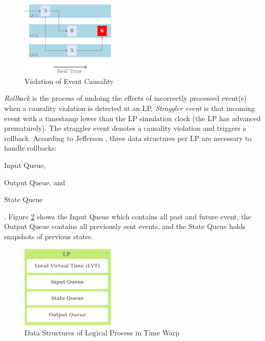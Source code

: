 \documentclass[11pt]{book}
\begin{document}
\begin{figure}
    \centering
    \includegraphics[width=0.4\textwidth]{figures/causality.pdf}
    \caption{Violation of Event Causality}\label{fig:causality_violation}
\end{figure}

\emph{Rollback} is the process of undoing the effects of incorrectly processed event(s) when a causality
violation is detected at an LP\@. \emph{Straggler event} is that incoming event with a timestamp lower than
the LP simulation clock (the LP has advanced prematurely).  The straggler event denotes a causality violation
and triggers a rollback.  According to Jefferson \cite{jefferson-85}, three data structures per LP are
necessary to handle rollbacks: \begin{inparaenum} [(1)] \item Input Queue, \item Output Queue, and \item State
  Queue\end{inparaenum}.  Figure \ref{fig:lp_data_structures} shows the Input Queue which contains all past
  and future event, the Output Queue contains all previously sent events, and the State Queue holds snapshots
  of previous states.

\begin{figure}
    \centering
    \includegraphics[width=0.4\textwidth]{figures/lp_data_structures.pdf}
    \caption{Data Structures of Logical Process in Time Warp}\label{fig:lp_data_structures}
\end{figure}
\end{document}
